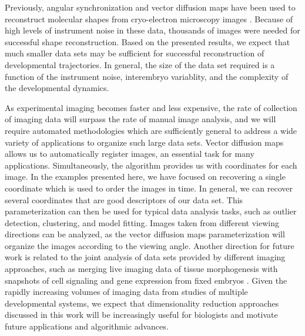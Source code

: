 \documentclass{pnastwo}
\begin{document}
\begin{article}
Previously, angular synchronization and vector diffusion maps have been used to reconstruct molecular shapes from cryo-electron microscopy images \cite{singer2012vector, zhao2014rotationally, singer2011viewing}.
%
Because of high levels of instrument noise in these data, thousands of images were needed for successful shape reconstruction. 
%
Based on the presented results, we expect that much smaller data sets may be sufficient for successful reconstruction of developmental trajectories.
%
In general, the size of the data set required is a function of the instrument noise, interembryo variablity, and the complexity of the developmental dynamics.
%
 
As experimental imaging becomes faster and less expensive, the rate of collection of imaging data will surpass the rate of manual image analysis,
and we will require automated methodologies which are sufficiently general to address a wide variety of applications to organize such large data sets.
%
Vector diffusion maps allows us to automatically register images, an essential task for many applications.
%
Simultaneously, the algorithm provides us with coordinates for each image.
%
In the examples presented here, we have focused on recovering a single coordinate which is used to order the images in time.
%
In general, we can recover several coordinates that are good descriptors of our data set.
%
This parameterization can then be used for typical data analysis tasks, such as outlier detection, clustering, and model fitting. 
%
Images taken from different viewing directions can be analyzed, as the vector diffusion maps parameterization will organize the images according to the viewing angle.
%
Another direction for future work is related to the joint analysis of data sets provided by different imaging approaches, such as merging live imaging data of tissue morphogenesis with snapshots of cell signaling and gene expression from fixed embryos \cite{krzic2012multiview, ichikawa2014live, rubel2010coupling}.  
%
Given the rapidly increasing volumes of imaging data from studies of multiple developmental systems, we expect that dimensionality reduction approaches discussed in this work will be increasingly useful for biologists and motivate future applications and algorithmic advances. 
  


\end{article}
\end{document}
